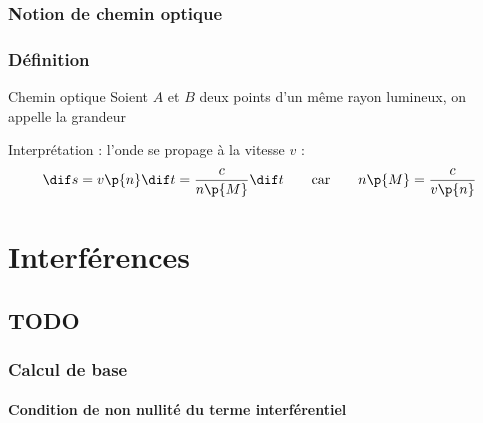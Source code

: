     \subsection{Notion de chemin optique}

    \subsection{Définition}

    \begin{definition}{Chemin optique}{}
        Soient $A$ et $B$ deux points d'un même rayon lumineux, on appelle  la grandeur 
    \end{definition}
    
    Interprétation : l'onde se propage à la vitesse $v$ :
    \[ \dif s = v\p{n}\dif t = \dfrac{c}{n\p{M}}\dif t \qquad\text{car}\qquad n\p{M} = \dfrac{c}{v\p{n}} \]
    
    \chapter{Interférences}
    
    \chaptertoc{}
    
    \section{TODO}
    
    \subsection{}
    
    \subsection{Calcul de base}
    
    \subsubsection{Condition de non nullité du terme interférentiel}
    
    \begin{center}
    \end{center}
    
